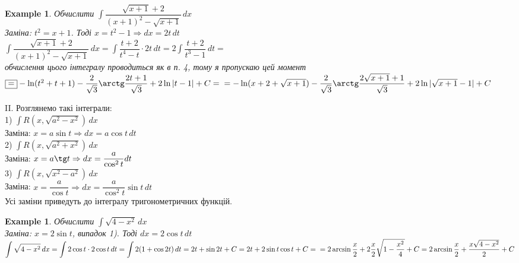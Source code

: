 \documentclass[a4paper, 10pt]{article}
\def\huge{\displaystyle}
\theoremstyle{theoremdd}
\theoremstyle{theoremdd}
\theoremstyle{theoremdd}
\theoremstyle{theoremdd}
\theoremstyle{theoremdd}
\newtheorem{example}[theorem]{Example}
\theoremstyle{theoremdd}
\theoremstyle{theoremdd}
\theoremstyle{theoremdd}
\theoremstyle{theoremdd}
\begin{document}
\begin{example}
Обчислити $\huge \int \dfrac{\sqrt{x+1}+2}{(x+1)^2 - \sqrt{x+1}}\,dx$\\
Заміна: $t^2 = x+1$. Тоді $x = t^2 -1 \Rightarrow dx = 2t \,dt$\\
$\huge \int \dfrac{\sqrt{x+1}+2}{(x+1)^2 - \sqrt{x+1}}\,dx = \int \dfrac{t+2}{t^4-t} \cdot 2t\,dt = 2 \int \dfrac{t+2}{t^3-1}\,dt \boxed{=}$\\
обчислення цього інтегралу проводиться як в п. 4, тому я пропускаю цей момент\\
$\boxed{=} -\ln(t^2+t+1) - \dfrac{2}{\sqrt{3}} \arctg \dfrac{2t+1}{\sqrt{3}} + 2 \ln|t-1|+ C = \\
= -\ln(x+2+\sqrt{x+1}) - \dfrac{2}{\sqrt{3}} \arctg \dfrac{2\sqrt{x+1}+1}{\sqrt{3}} + 2 \ln|\sqrt{x+1}-1| + C$
\end{example}

II. Розглянемо такі інтеграли:\\
1) $\huge \int R(x,\sqrt{a^2-x^2})\,dx$\\
Заміна: $x = a\sin t \Rightarrow dx = a\cos t \,dt$
\bigskip \\

2) $\huge \int R(x,\sqrt{a^2+x^2})\,dx$\\
Заміна: $x = a\tg t \Rightarrow dx = \dfrac{a}{\cos^2 t} dt$\bigskip \\

\iffalse
Або інша заміна: $x = a \sh t \Rightarrow dx = a \ch t \,dt$\\
$\boxed{=} \huge \int R(a\sh t, a \ch t) \cdot a \ch t\,dt$
\bigskip \\
\fi

3) $\huge \int R(x, \sqrt{x^2-a^2})\,dx$\\
Заміна: $x = \dfrac{a}{\cos t} \Rightarrow dx = \dfrac{a}{\cos^2 t} \sin t\,dt$\\

\iffalse
Або інша заміна: $x = a \ch t \Rightarrow dx = a \sh t \,dt$\\
$\boxed{=} \huge \int R(a \ch t, a \sh t) \cdot a \sh t \,dt$
\bigskip \\
\fi
Усі заміни приведуть до інтегралу тригонометричних функцій.

\begin{example}
Обчислити $\huge \int \sqrt{4-x^2}\,dx$\\
Заміна: $x = 2\sin t$, випадок 1). Тоді $dx = 2 \cos t \,dt$\\
$\huge \int \sqrt{4-x^2}\,dx = \int 2 \cos t \cdot 2 \cos t \,dt = \int 2(1+\cos 2t)\,dt = 2t + \sin 2t + C = 2t + 2 \sin t \cos t + C = \\ = 2 \arcsin \frac{x}{2} + 2 \frac{x}{2} \sqrt{1-\frac{x^2}{4}}+C = 2 \arcsin \frac{x}{2} + \dfrac{x \sqrt{4-x^2}}{2} + C$
\end{example}
\end{document}
